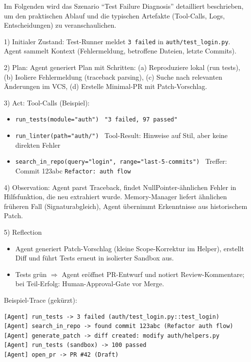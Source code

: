 Im Folgenden wird das Szenario \enquote{Test Failure Diagnosis} detailliert beschrieben, um den praktischen Ablauf und die typischen Artefakte (Tool-Calls, Logs, Entscheidungen) zu veranschaulichen.

1) Initialer Zustand: Test-Runner meldet \texttt{3 failed} in \texttt{auth/test\_login.py}. Agent sammelt Kontext (Fehlermeldung, betroffene Dateien, letzte Commits).

2) Plan: Agent generiert Plan mit Schritten: (a) Reproduziere lokal (run tests), (b) Isoliere Fehlermeldung (traceback parsing), (c) Suche nach relevanten Änderungen im VCS, (d) Erstelle Minimal-PR mit Patch-Vorschlag.

3) Act: Tool-Calls (Beispiel):
\begin{itemize}
  \item \texttt{run\_tests(module="auth")} \textrightarrow\ \texttt{"3 failed, 97 passed"}
  \item \texttt{run\_linter(path="auth/")} \textrightarrow\ Tool-Result: Hinweise auf Stil, aber keine direkten Fehler
  \item \texttt{search\_in\_repo(query="login", range="last-5-commits")} \textrightarrow\ Treffer: Commit 123abc \texttt{Refactor: auth flow}
\end{itemize}

4) Observation: Agent parst Traceback, findet NullPointer-ähnlichen Fehler in Hilfsfunktion, die neu extrahiert wurde. Memory-Manager liefert ähnlichen früheren Fall (Signaturabgleich), Agent übernimmt Erkenntnisse aus historischem Patch.

5) Reflection 
\begin{sloppypar}
\begin{itemize}
  \item Agent generiert Patch-Vorschlag (kleine Scope-Korrektur im Helper), erstellt Diff und führt Tests erneut in isolierter Sandbox aus.
  \item Tests grün $\Rightarrow$ Agent eröffnet PR-Entwurf und notiert Review-Kommentare; bei Teil-Erfolg: Human-Approval-Gate vor Merge.
\end{itemize}
\end{sloppypar}

Beispiel-Trace (gekürzt):
\begin{lstlisting}[breaklines=true, basicstyle=\ttfamily\small]
[Agent] run_tests -> 3 failed (auth/test_login.py::test_login)
[Agent] search_in_repo -> found commit 123abc (Refactor auth flow)
[Agent] generate_patch -> diff created: modify auth/helpers.py
[Agent] run_tests (sandbox) -> 100 passed
[Agent] open_pr -> PR #42 (Draft)
\end{lstlisting}


